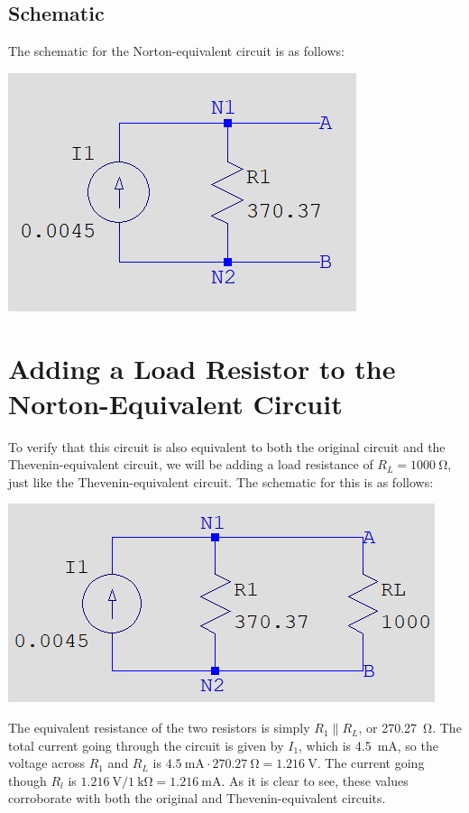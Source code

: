 \documentclass{article}
\begin{document}
\subsection{Schematic} The schematic for the Norton-equivalent circuit
is as follows:

\includegraphics{Images/Norton.png}

\pagebreak

\section{Adding a Load Resistor to the Norton-Equivalent Circuit}

To verify that this circuit is also equivalent to both the
original circuit and the Thevenin-equivalent circuit, we will
be adding a load resistance of \(R_L = \SI{1000}{\ohm}\),
just like the Thevenin-equivalent circuit. The schematic
for this is as follows:

\includegraphics{Images/Norton_RL.png}

The equivalent resistance of the two resistors is simply
\(R_1 \parallel R_L\), or \SI{270.27}{\ohm}. The total
current going through the circuit is given by \(I_1\), which
is \SI{4.5}{\milli\ampere}, so the voltage across \(R_1\) and
\(R_L\) is \(\SI{4.5}{\milli\ampere}\cdot\SI{270.27}{\ohm}
= \SI{1.216}{\volt}\). The current going though \(R_l\) is
\(\SI{1.216}{\volt} / \SI{1}{\kilo\ohm} = \SI{1.216}{\milli\ampere}\).
As it is clear to see, these values corroborate with both
the original and Thevenin-equivalent circuits.
\end{document}
